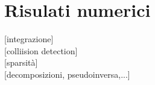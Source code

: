 
\chapter{Risulati numerici}
[integrazione]\\

[colliision detection]\\

[sparsità]\\

[decomposizioni, pseudoinversa,...]\\

